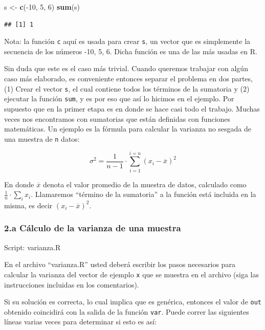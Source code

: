 \documentclass[]{article}
\newenvironment{Shaded}{}{}
\newcommand{\KeywordTok}[1]{\textcolor[rgb]{0.00,0.44,0.13}{\textbf{{#1}}}}
\newcommand{\DecValTok}[1]{\textcolor[rgb]{0.25,0.63,0.44}{{#1}}}
\newcommand{\NormalTok}[1]{{#1}}
\begin{document}
\begin{Shaded}
\begin{Highlighting}[]
\NormalTok{s <- }\KeywordTok{c}\NormalTok{(-}\DecValTok{10}\NormalTok{, }\DecValTok{5}\NormalTok{, }\DecValTok{6}\NormalTok{)}
\KeywordTok{sum}\NormalTok{(s)}
\end{Highlighting}
\end{Shaded}
\begin{verbatim}
## [1] 1
\end{verbatim}
Nota: la función \texttt{c} aquí es usada para crear \texttt{s}, un
vector que es simplemente la secuencia de los números -10, 5, 6. Dicha
función es una de las más usadas en R.

Sin duda que este es el caso más trivial. Cuando queremos trabajar con
algún caso más elaborado, es conveniente entonces separar el problema en
dos partes, (1) Crear el vector \texttt{s}, el cual contiene todos los
términos de la sumatoria y (2) ejecutar la función \texttt{sum}, y es
por eso que así lo hicimos en el ejemplo. Por supuesto que en la primer
etapa es en donde se hace casi todo el trabajo. Muchas veces nos
encontramos con sumatorias que están definidas con funciones
matemáticas. Un ejemplo es la fórmula para calcular la varianza no
sesgada de una muestra de \texttt{n} datos:

\[
  \sigma ^ 2 = \frac{1}{n - 1} \cdot \sum_{i=1}^{i=n} (x_i - \overline{x}) ^ 2 
\]

En donde $\overline{x}$ denota el valor promedio de la muestra de datos,
calculado como $\frac{1}{n} \cdot \sum_i x_i$. Llamaremos ``término de
la sumatoria'' a la función está incluida en la misma, es decir
$(x_i - \overline{x}) ^ 2$.

\subsubsection{2.a Cálculo de la varianza de una muestra}

Script: varianza.R

En el archivo ``varianza.R'' usted deberá escribir los pasos necesarios
para calcular la varianza del vector de ejemplo \texttt{x} que se
muestra en el archivo (siga las instrucciones incluidas en los
comentarios).

Si su solución es correcta, lo cual implica que es genérica, entonces el
valor de \texttt{out} obtenido coincidirá con la salida de la función
\texttt{var}. Puede correr las siguientes líneas varias veces para
determinar si esto es así:
\end{document}
